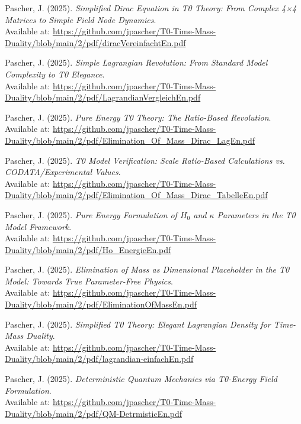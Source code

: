\documentclass[12pt,a4paper]{article}
\begin{document}
	\begin{thebibliography}{99}
		Pascher, J. (2025). \textit{Simplified Dirac Equation in T0 Theory: From Complex 4×4 Matrices to Simple Field Node Dynamics}. \\
		Available at: \url{https://github.com/jpascher/T0-Time-Mass-Duality/blob/main/2/pdf/diracVereinfachtEn.pdf}
		
		Pascher, J. (2025). \textit{Simple Lagrangian Revolution: From Standard Model Complexity to T0 Elegance}. \\
		Available at: \url{https://github.com/jpascher/T0-Time-Mass-Duality/blob/main/2/pdf/LagrandianVergleichEn.pdf}
		
		Pascher, J. (2025). \textit{Pure Energy T0 Theory: The Ratio-Based Revolution}. \\
		Available at: \url{https://github.com/jpascher/T0-Time-Mass-Duality/blob/main/2/pdf/Elimination_Of_Mass_Dirac_LagEn.pdf}
		
		Pascher, J. (2025). \textit{T0 Model Verification: Scale Ratio-Based Calculations vs. CODATA/Experimental Values}. \\
		Available at: \url{https://github.com/jpascher/T0-Time-Mass-Duality/blob/main/2/pdf/Elimination_Of_Mass_Dirac_TabelleEn.pdf}
		
		Pascher, J. (2025). \textit{Pure Energy Formulation of $H_0$ and $\kappa$ Parameters in the T0 Model Framework}. \\
		Available at: \url{https://github.com/jpascher/T0-Time-Mass-Duality/blob/main/2/pdf/Ho_EnergieEn.pdf}
		
		Pascher, J. (2025). \textit{Elimination of Mass as Dimensional Placeholder in the T0 Model: Towards True Parameter-Free Physics}. \\
		Available at: \url{https://github.com/jpascher/T0-Time-Mass-Duality/blob/main/2/pdf/EliminationOfMassEn.pdf}
		
		Pascher, J. (2025). \textit{Simplified T0 Theory: Elegant Lagrangian Density for Time-Mass Duality}. \\
		Available at: \url{https://github.com/jpascher/T0-Time-Mass-Duality/blob/main/2/pdf/lagrandian-einfachEn.pdf}
		
		Pascher, J. (2025). \textit{Deterministic Quantum Mechanics via T0-Energy Field Formulation}. \\
		Available at: \url{https://github.com/jpascher/T0-Time-Mass-Duality/blob/main/2/pdf/QM-DetrmisticEn.pdf}
		

\end{thebibliography}
\end{document}
